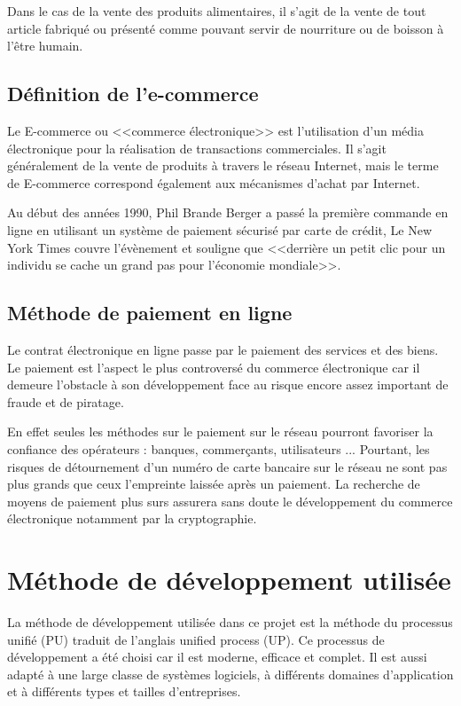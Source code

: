\documentclass{report}
\begin{document}
Dans le cas de la vente des produits alimentaires, il s'agit de la vente de tout article fabriqué ou présenté comme pouvant servir de nourriture ou de boisson à l'être humain.

\subsection{Définition de l'e-commerce}
Le E-commerce ou <<commerce électronique>> est l’utilisation d’un média électronique pour la réalisation de transactions commerciales. Il s’agit généralement de la vente de produits à travers le réseau Internet, mais le terme de E-commerce correspond également aux mécanismes d’achat par Internet.

Au début des années 1990, Phil Brande Berger a passé la première commande en ligne en utilisant un système de paiement sécurisé par carte de crédit, Le New York Times couvre l’évènement et souligne que <<derrière un petit clic pour un individu se cache un grand pas pour l’économie mondiale>>.

\subsection{Méthode de paiement en ligne}
Le contrat électronique en ligne passe par le paiement des services et des biens. Le paiement est l’aspect le plus controversé du commerce électronique car il demeure l’obstacle à son développement face au risque encore assez important de fraude et de piratage.

En effet seules les méthodes sur le paiement sur le réseau pourront favoriser la confiance des opérateurs : banques, commerçants, utilisateurs ... Pourtant, les risques de détournement d’un numéro de carte bancaire sur le réseau ne sont pas plus grands que ceux l’empreinte laissée après un paiement. La recherche de moyens de paiement plus surs assurera sans doute le développement du commerce électronique notamment par la cryptographie.

\section{Méthode de développement utilisée}
La méthode de développement utilisée dans ce projet est la méthode du processus
unifié (PU) traduit de l’anglais unified process (UP). Ce processus de développement a été choisi car il est moderne, efficace et complet. Il est aussi adapté à une large classe de systèmes logiciels, à différents domaines d'application et à différents types et tailles d'entreprises.
\end{document}
